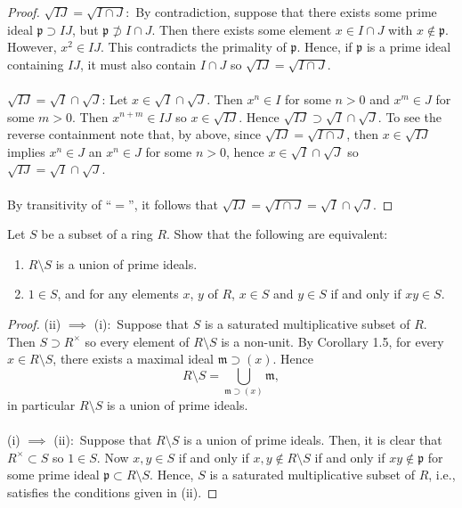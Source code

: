 \begin{proof}
$\sqrt{IJ}=\sqrt{I\cap J}$:~By contradiction, suppose that there
exists some prime ideal $\mathfrak{p}\supset IJ$, but
$\mathfrak{p}\nsupset I\cap J$. Then there exists some element
$x\in I\cap J$ with $x\notin\mathfrak{p}$. However, $x^2\in
IJ$. This contradicts the primality of $\mathfrak{p}$. Hence, if
$\mathfrak{p}$ is a prime ideal containing $IJ$, it must also
contain $I\cap J$ so $\sqrt{IJ}=\sqrt{I\cap J}$.
\\\\
$\sqrt{IJ}=\sqrt{I}\cap\sqrt{J}$: Let
$x\in\sqrt{I}\cap\sqrt{J}$. Then $x^n\in I$ for some $n>0$ and
$x^m\in J$ for some $m>0$. Then $x^{n+m}\in IJ$ so
$x\in\sqrt{IJ}$. Hence $\sqrt{IJ}\supset\sqrt{I}\cap\sqrt{J}$. To
see the reverse containment note that, by above, since
$\sqrt{IJ}=\sqrt{I\cap J}$, then $x\in\sqrt{IJ}$ implies $x^n\in
J$ an $x^n\in J$ for some $n>0$, hence $x\in\sqrt{I}\cap\sqrt{J}$
so $\sqrt{IJ}=\sqrt{I}\cap\sqrt{J}$.
\\\\
By transitivity of ``$=$'', it follows that
$\sqrt{IJ}=\sqrt{I\cap J}=\sqrt{I}\cap\sqrt{J}$.
\end{proof}
\newpage
\begin{problem}
Let $S$ be a subset of a ring $R$. Show that the following are
equivalent:
\begin{enumerate}[noitemsep,label=(\roman*)]
\item $R\setminus S$ is a union of prime ideals.
\item $1\in S$, and for any elements $x$, $y$ of $R$, $x\in S$
  and $y\in S$ if and only if $xy\in S$.
\end{enumerate}
\end{problem}
\begin{proof}
(ii) $\implies$ (i):~Suppose that $S$ is a saturated
multiplicative subset of $R$. Then $S\supset R^\times$ so every
element of $R\setminus S$ is a non-unit. By Corollary 1.5, for
every $x\in R\setminus S$, there exists a maximal ideal
$\mathfrak{m}\supset(x)$. Hence
\[
R\setminus S=\bigcup_{\mathfrak{m}\supset(x)}\mathfrak{m},
\]
in particular $R\setminus S$ is a union of prime ideals.
\\\\
(i) $\implies$ (ii):~Suppose that $R\setminus S$ is a union of
prime ideals. Then, it is clear that $R^\times \subset S$ so
$1\in S$. Now $x,y\in S$ if and only if $x,y\notin R\setminus S$
if and only if $xy\notin\mathfrak{p}$ for some prime ideal
$\mathfrak{p}\subset R\setminus S$. Hence, $S$ is a saturated
multiplicative subset of $R$, i.e., satisfies the conditions
given in (ii).
\end{proof}
